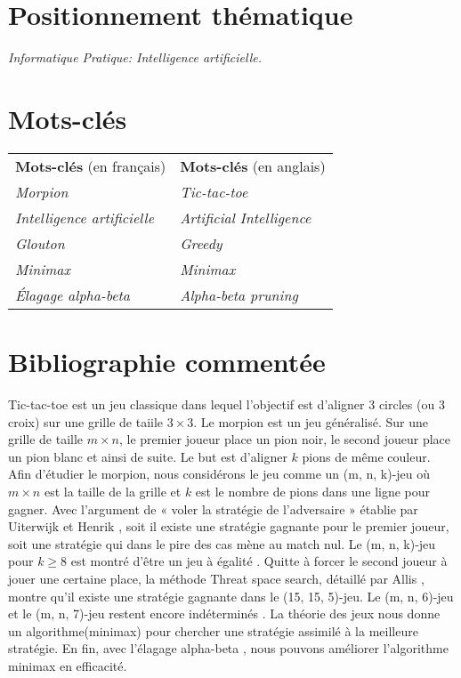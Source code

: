 \documentclass[12pt,a4paper]{article}
\begin{document}
\flushleft
\section*{\bfseries Positionnement thématique}

\hspace*{7mm}\textit{Informatique Pratique: Intelligence artificielle.}

\section*{\bfseries Mots-clés}

\begin{tabular}{l l}
    {\bfseries Mots-clés} (en français) & {\bfseries Mots-clés} (en anglais)\\
    \textit{Morpion}& \textit{Tic-tac-toe}\\
    \textit{Intelligence artificielle} & \textit{Artificial Intelligence}\\
    \textit{Glouton} & \textit{Greedy}\\
    \textit{Minimax} & \textit{Minimax}\\
    \textit{Élagage alpha-beta} & \textit{Alpha-beta pruning}
\end{tabular}

\section*{\bfseries Bibliographie commentée}
\justify
\hspace*{7mm}Tic-tac-toe est un jeu classique dans lequel l'objectif est d'aligner 3 circles (ou 3 croix) sur une grille de taiile $3 \times 3$. Le morpion est un jeu généralisé. Sur une grille de taille $m \times n$, le premier joueur place un pion noir, le second joueur place un pion blanc et ainsi de suite. Le but est d'aligner $k$ pions de même couleur.\\
\hspace*{7mm}Afin d'étudier le morpion, nous considérons le jeu comme un (m, n, k)-jeu où $m\times n$ est la taille de la grille et $k$ est le nombre de pions dans une ligne pour gagner. Avec l'argument de « voler la stratégie de l'adversaire » établie par Uiterwijk et Henrik \cite{steal}, soit il existe une stratégie gagnante pour le premier joueur, soit une stratégie qui dans le pire des cas mène au match nul. Le (m, n, k)-jeu pour $k\ge 8$ est montré d'être un jeu à égalité \cite{9-win, 8-win}. Quitte à forcer le second joueur à jouer une certaine place, la méthode Threat space search, détaillé par Allis \cite{Threat}, montre qu'il existe une stratégie gagnante dans le (15, 15, 5)-jeu. Le (m, n, 6)-jeu et le (m, n, 7)-jeu restent encore indéterminés \cite{67-win}. La théorie des jeux nous donne un algorithme(minimax)\cite{minimax} pour chercher une stratégie assimilé à la meilleure stratégie. En fin, avec l'élagage alpha-beta \cite{alpha-beta}, nous pouvons améliorer l'algorithme minimax en efficacité.
\end{document}
